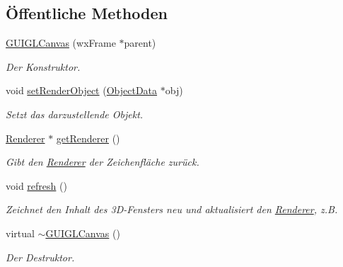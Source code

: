 \subsection*{Öffentliche Methoden}
\begin{DoxyCompactItemize}
\item 
\hyperlink{classGUIGLCanvas_ae77992061b501fa995c08cd568c2c6ad}{G\-U\-I\-G\-L\-Canvas} (wx\-Frame $\ast$parent)
\begin{DoxyCompactList}\small\item\em Der Konstruktor. \end{DoxyCompactList}\item 
void \hyperlink{classGUIGLCanvas_a643f11a7ef05829a6c48d037ad2c4b9b}{set\-Render\-Object} (\hyperlink{classObjectData}{Object\-Data} $\ast$obj)
\begin{DoxyCompactList}\small\item\em Setzt das darzustellende Objekt. \end{DoxyCompactList}\item 
\hyperlink{classRenderer}{Renderer} $\ast$ \hyperlink{classGUIGLCanvas_a57085ce831e09e627fe93f17a6c79dfa}{get\-Renderer} ()
\begin{DoxyCompactList}\small\item\em Gibt den \hyperlink{classRenderer}{Renderer} der Zeichenfläche zurück. \end{DoxyCompactList}\item 
void \hyperlink{classGUIGLCanvas_a883d5bc79fcfc6e2c9ceeb41a0c0e77e}{refresh} ()
\begin{DoxyCompactList}\small\item\em Zeichnet den Inhalt des 3\-D-\/\-Fensters neu und aktualisiert den \hyperlink{classRenderer}{Renderer}, z.\-B. \end{DoxyCompactList}\item 
virtual \hyperlink{classGUIGLCanvas_af6358f8d4e95c6864ff005d4764fffbc}{$\sim$\-G\-U\-I\-G\-L\-Canvas} ()
\begin{DoxyCompactList}\small\item\em Der Destruktor. \end{DoxyCompactList}\end{DoxyCompactItemize}
